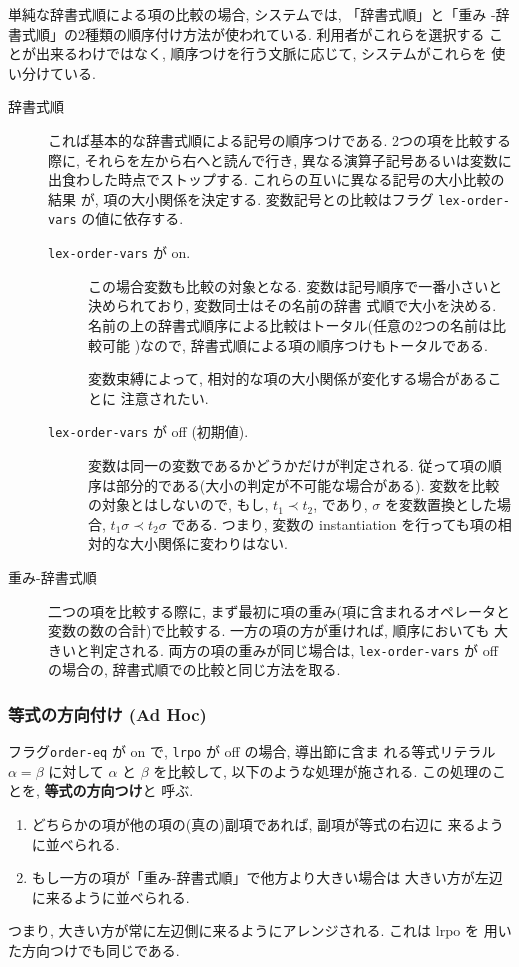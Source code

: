 単純な辞書式順による項の比較の場合, システムでは, 「辞書式順」と「重み
-辞書式順」の2種類の順序付け方法が使われている. 利用者がこれらを選択する
ことが出来るわけではなく, 順序つけを行う文脈に応じて, システムがこれらを
使い分けている.
\begin{description}
\item[辞書式順]
  これば基本的な辞書式順による記号の順序つけである.   2つの項を比較する
  際に, それらを左から右へと読んで行き,   異なる演算子記号あるいは変数に
  出食わした時点でストップする. これらの互いに異なる記号の大小比較の結果
  が, 項の大小関係を決定する.
  変数記号との比較はフラグ \texttt{lex-order-vars} の値に依存する.
  \begin{description}
  \item[\texttt{lex-order-vars} が on.]
    この場合変数も比較の対象となる. 
    変数は記号順序で一番小さいと決められており, 変数同士はその名前の辞書
    式順で大小を決める.  
    名前の上の辞書式順序による比較はトータル(任意の2つの名前は比較可能
    )なので, 辞書式順による項の順序つけもトータルである.

    変数束縛によって, 相対的な項の大小関係が変化する場合があることに
    注意されたい.

  \item[\texttt{lex-order-vars} が off (初期値).]
    変数は同一の変数であるかどうかだけが判定される.
    従って項の順序は部分的である(大小の判定が不可能な場合がある).
    変数を比較の対象とはしないので,
    もし, $t_1 \prec t_2$, であり, $\sigma$ を変数置換とした場合,
    $t_1\sigma \prec t_2\sigma$ である. つまり, 変数の instantiation
    を行っても項の相対的な大小関係に変わりはない.
  \end{description}

\item[重み-辞書式順]
  二つの項を比較する際に, まず最初に項の重み(項に含まれるオペレータと
  変数の数の合計)で比較する. 一方の項の方が重ければ, 順序においても
  大きいと判定される. 両方の項の重みが同じ場合は, \texttt{lex-order-vars}
  が off の場合の, 辞書式順での比較と同じ方法を取る.

\end{description}


\subsubsection{等式の方向付け (Ad Hoc)} \label{sec:orient}

フラグ\texttt{order-eq} が on で, \texttt{lrpo} が off の場合, 導出節に含ま
れる等式リテラル $\alpha=\beta$ に対して $\alpha$ と $\beta$ を比較して,
以下のような処理が施される. この処理のことを, \textbf{等式の方向つけ}と
呼ぶ. 
\begin{enumerate}
\item どちらかの項が他の項の(真の)副項であれば, 副項が等式の右辺に
  来るように並べられる.
\item もし一方の項が「重み-辞書式順」で他方より大きい場合は
  大きい方が左辺に来るように並べられる.
\end{enumerate}
つまり, 大きい方が常に左辺側に来るようにアレンジされる. これは lrpo を
用いた方向つけでも同じである. 

